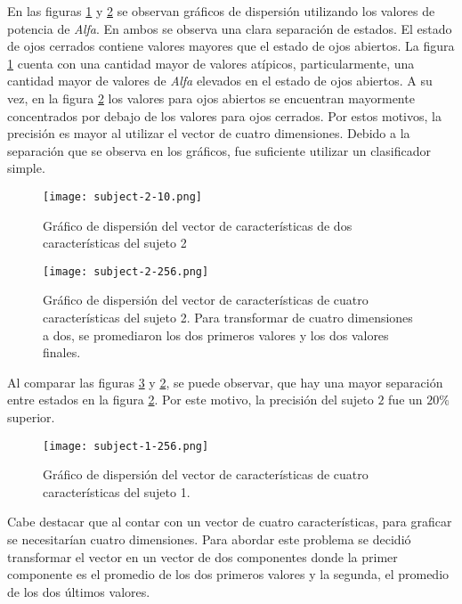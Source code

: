 En las figuras \ref{fig:subject-2-10} y \ref{fig:subject-2-256} se observan gráficos de dispersión utilizando los valores de potencia de \emph{Alfa}. En ambos se observa una clara separación de estados. El estado de ojos cerrados contiene valores mayores que el estado de ojos abiertos. La figura \ref{fig:subject-2-10} cuenta con una cantidad mayor de valores atípicos, particularmente, una cantidad mayor de valores de \emph{Alfa} elevados en el estado de ojos abiertos. A su vez, en la figura \ref{fig:subject-2-256} los valores para ojos abiertos se encuentran mayormente concentrados por debajo de los valores para ojos cerrados. Por estos motivos, la precisión es mayor al utilizar el vector de cuatro dimensiones. Debido a la separación que se observa en los gráficos, fue suficiente utilizar un clasificador simple.

 \begin{figure}[H]
	\centering
    \texttt{[image: subject-2-10.png]}
    \caption{Gráfico de dispersión del vector de características de dos características del sujeto 2}
	\label{fig:subject-2-10}
\end{figure}

 \begin{figure}[H]
	\centering
    \texttt{[image: subject-2-256.png]}
    \caption{Gráfico de dispersión del vector de características de cuatro características del sujeto 2. Para transformar de cuatro dimensiones a dos, se promediaron los dos primeros valores y los dos valores finales.}
	\label{fig:subject-2-256}
\end{figure}


Al comparar las figuras \ref{fig:subject-1-256} y \ref{fig:subject-2-256}, se puede observar, que hay una mayor separación entre estados en la figura \ref{fig:subject-2-256}. Por este motivo, la precisión del sujeto $2$ fue un $20\%$ superior.

 \begin{figure}[H]
	\centering
    \texttt{[image: subject-1-256.png]}
    \caption{Gráfico de dispersión del vector de características de cuatro características del sujeto 1.}
	\label{fig:subject-1-256}
\end{figure}

Cabe destacar que al contar con un vector de cuatro características, para graficar se necesitarían cuatro dimensiones. Para abordar este problema se decidió transformar el vector en un vector de dos componentes donde la primer componente es el promedio de los dos primeros valores y la segunda, el promedio de los dos últimos valores.

